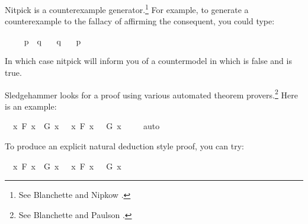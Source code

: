 \begin{isabellebody}
\begin{isamarkuptext}
\end{isamarkuptext}\isamarkuptrue%
%
\isamarkuptrue%
%
\begin{isamarkuptext}%
Nitpick is a counterexample generator.\footnote{See Blanchette and Nipkow \cite{blanchette_nitpick_2010}.} 
For example, to generate a counterexample to the fallacy of affirming the consequent, you could type:%
\end{isamarkuptext}\isamarkuptrue%
\isamarkupfalse%
\ \isanewline
\ \ \ {\isachardoublequoteopen}p\ {\isasymlongrightarrow}\ q{\isachardoublequoteclose}\isanewline
\ \ \ {\isachardoublequoteopen}q{\isachardoublequoteclose}\isanewline
\ \ \ {\isachardoublequoteopen}p{\isachardoublequoteclose}\ \isamarkupfalse%
%
\isadelimproof
\ %
\endisadelimproof
%
\isatagproof
{}\isamarkupfalse%
%
\endisatagproof
{\isafoldproof}%
%
\isadelimproof
%
\endisadelimproof
%
\begin{isamarkuptext}%
In which case nitpick will inform you of a countermodel in which   is false and 
 is true.%
\end{isamarkuptext}\isamarkuptrue%
%
\isamarkuptrue%
%
\begin{isamarkuptext}%
Sledgehammer looks for a proof using various automated theorem provers.\footnote{See Blanchette
and Paulson \cite{blanchette_hammering_2016}.} 
Here is an example:%
\end{isamarkuptext}\isamarkuptrue%
\isamarkupfalse%
\ {\isachardoublequoteopen}{\isacharparenleft}{\isasymforall}\ x{\isachardot}\ F\ x\ {\isasymlongrightarrow}\ G\ x{\isacharparenright}\ {\isasymor}\ {\isacharparenleft}{\isasymexists}\ x{\isachardot}\ F\ x\ {\isasymand}\ {\isasymnot}\ G\ x{\isacharparenright}{\isachardoublequoteclose}\ \isamarkupfalse%
\isanewline
%
\isadelimproof
\ \ %
\endisadelimproof
%
\isatagproof
{}\isamarkupfalse%
\ auto%
\endisatagproof
{\isafoldproof}%
%
\isadelimproof
%
\endisadelimproof
%
\begin{isamarkuptext}%
To produce an explicit natural deduction style proof, you can try:%
\end{isamarkuptext}\isamarkuptrue%
\isamarkupfalse%
\ {\isachardoublequoteopen}{\isacharparenleft}{\isasymforall}\ x{\isachardot}\ F\ x\ {\isasymlongrightarrow}\ G\ x{\isacharparenright}\ {\isasymor}\ {\isacharparenleft}{\isasymexists}\ x{\isachardot}\ F\ x\ {\isasymand}\ {\isasymnot}\ G\ x{\isacharparenright}{\isachardoublequoteclose}\ \isamarkupfalse%

\end{isabellebody}
